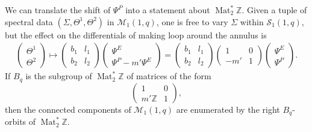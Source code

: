 \documentclass{article}
\numberwithin{equation}{section}
\numberwithin{figure}{section}
\DeclareMathOperator{\Mat}{Mat}
\newcommand{\Z}{\mathbb{Z}}
\begin{document}
We can translate the shift of $\Psi^P$ into a statement about $\Mat_2^*\Z$. Given a tuple of spectral data $(\Sigma,\Theta^1,\Theta^2)$ in $\mathcal{M}_1(1,q)$, one is free to vary $\Sigma$ within $\mathcal{S}_1(1,q)$, but the effect on the differentials of making loop around  the annulus is
\begin{align*}
\begin{pmatrix}
\Theta^1 \\ \Theta^2
\end{pmatrix}
\mapsto
\begin{pmatrix}
b_1 & l_1 \\
b_2 & l_2
\end{pmatrix}
\begin{pmatrix}
    \Psi^E \\ \Psi^P - m' \Psi^E
\end{pmatrix}
=
\begin{pmatrix}
b_1 & l_1 \\
b_2 & l_2
\end{pmatrix}
\begin{pmatrix}
    1 & 0 \\
    -m' & 1
\end{pmatrix}
\begin{pmatrix}
    \Psi^E \\ \Psi^P
    \end{pmatrix}.
\end{align*}
If $B_q$ is the subgroup of $\Mat_2^*\Z$ of matrices of the form
\[
\begin{pmatrix}
1 & 0 \\
m'\Z & 1
\end{pmatrix},
\]
then the connected components of $\mathcal{M}_1(1,q)$ are enumerated by the right $B_q$-orbits of $\Mat_2^*\Z$.
\end{document}
